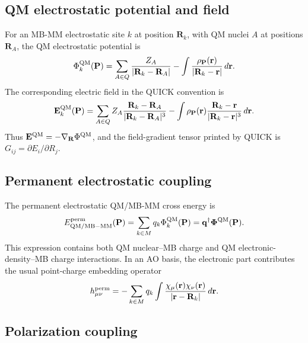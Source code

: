 \documentclass[11pt]{article}
\begin{document}
\subsection{QM electrostatic potential and field}

For an MB-MM electrostatic site $k$ at position $\mathbf{R}_k$, with QM
nuclei $A$ at positions $\mathbf{R}_A$, the QM electrostatic potential is
\begin{equation}
  \Phi_k^{\rm QM}(\mathbf{P})
  =
  \sum_{A\in Q}\frac{Z_A}{|\mathbf{R}_k-\mathbf{R}_A|}
  -
  \int
  \frac{\rho_{\mathbf{P}}(\mathbf{r})}
       {|\mathbf{R}_k-\mathbf{r}|}\,d\mathbf{r}.
  \label{eq:qm_potential_at_mbx_site}
\end{equation}
The corresponding electric field in the QUICK convention is
\begin{equation}
  \mathbf{E}_k^{\rm QM}(\mathbf{P})
  =
  \sum_{A\in Q} Z_A
  \frac{\mathbf{R}_k-\mathbf{R}_A}
       {|\mathbf{R}_k-\mathbf{R}_A|^3}
  -
  \int \rho_{\mathbf{P}}(\mathbf{r})
  \frac{\mathbf{R}_k-\mathbf{r}}
       {|\mathbf{R}_k-\mathbf{r}|^3}\,d\mathbf{r}.
  \label{eq:qm_field_at_mbx_site}
\end{equation}
Thus $\mathbf{E}^{\rm QM}=-\nabla_{\mathbf{R}}\Phi^{\rm QM}$, and the
field-gradient tensor printed by QUICK is
$G_{ij}=\partial E_i/\partial R_j$.

\subsection{Permanent electrostatic coupling}

The permanent electrostatic QM/MB-MM cross energy is
\begin{equation}
  E_{\rm QM/MB-MM}^{\rm perm}(\mathbf{P})
  =
  \sum_{k\in M}q_k\Phi_k^{\rm QM}(\mathbf{P})
  =
  \mathbf{q}^{\dagger}\boldsymbol{\Phi}^{\rm QM}(\mathbf{P}).
  \label{eq:qmmm_perm}
\end{equation}
This expression contains both QM nuclear--MB charge and QM
electronic-density--MB charge interactions. In an AO basis, the electronic
part contributes the usual point-charge embedding operator
\begin{equation}
  h_{\mu\nu}^{\rm perm}
  =
  -\sum_{k\in M}q_k
  \int
  \frac{\chi_\mu(\mathbf{r})\chi_\nu(\mathbf{r})}
       {|\mathbf{r}-\mathbf{R}_k|}\,d\mathbf{r}.
  \label{eq:qmmm_perm_operator}
\end{equation}

\subsection{Polarization coupling}
\end{document}
